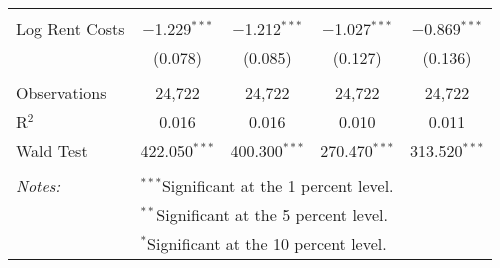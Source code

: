 \begin{table}[!htbp]
\begin{tabular}{@{\extracolsep{1pt}}lcccc}
  & & & & \\ 
 Log Rent Costs & $-$1.229$^{***}$ & $-$1.212$^{***}$ & $-$1.027$^{***}$ & $-$0.869$^{***}$ \\ 
  & (0.078) & (0.085) & (0.127) & (0.136) \\ 
  & & & & \\ 
Observations & 24,722 & 24,722 & 24,722 & 24,722 \\ 
R$^{2}$ & 0.016 & 0.016 & 0.010 & 0.011 \\ 
Wald Test & 422.050$^{***}$ & 400.300$^{***}$ & 270.470$^{***}$ & 313.520$^{***}$ \\ 
\hline \\[-1.8ex] 
\textit{Notes:} & \multicolumn{4}{l}{$^{***}$Significant at the 1 percent level.} \\ 
 & \multicolumn{4}{l}{$^{**}$Significant at the 5 percent level.} \\ 
 & \multicolumn{4}{l}{$^{*}$Significant at the 10 percent level.} \\ 
\end{tabular} 
\end{table} 
